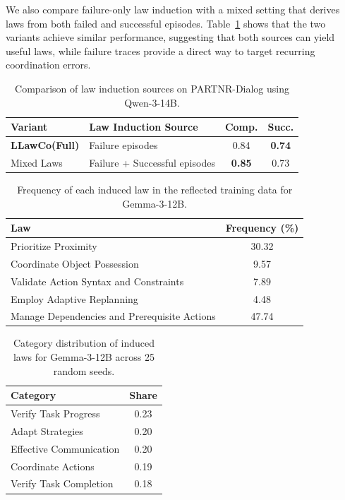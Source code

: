 \documentclass{article}
\theoremstyle{plain}
\theoremstyle{definition}
\theoremstyle{remark}
\newcommand{\name}{LLawCo\xspace}
\begin{document}
We also compare failure-only law induction with a mixed setting that derives laws from both failed and successful episodes. Table~\ref{tab:mixed-laws} shows that the two variants achieve similar performance, suggesting that both sources can yield useful laws, while failure traces provide a direct way to target recurring coordination errors.

\begin{table}[htbp]
\centering
\small
\setlength{\tabcolsep}{6pt}
\caption{Comparison of law induction sources on PARTNR-Dialog using Qwen-3-14B.}
\label{tab:mixed-laws}
\begin{tabular}{l|l|cc}
\toprule
\textbf{Variant} & \textbf{Law Induction Source} & \textbf{Comp.} & \textbf{Succ.} \\
\midrule
\textbf{\name (Full)} & Failure episodes & 0.84 & \textbf{0.74} \\
Mixed Laws & Failure + Successful episodes & \textbf{0.85} & 0.73 \\
\bottomrule
\end{tabular}
\end{table}

\begin{table}[htbp]
\centering
\small
\setlength{\tabcolsep}{6pt}
\caption{Frequency of each induced law in the reflected training data for Gemma-3-12B.}
\label{tab:law-frequency}
\begin{tabular}{l|c}
\toprule
\textbf{Law} & \textbf{Frequency (\%)} \\
\midrule
Prioritize Proximity & 30.32 \\
Coordinate Object Possession & 9.57 \\
Validate Action Syntax and Constraints & 7.89 \\
Employ Adaptive Replanning & 4.48 \\
Manage Dependencies and Prerequisite Actions & 47.74 \\
\bottomrule
\end{tabular}
\end{table}

\begin{table}[htbp]
\centering
\small
\setlength{\tabcolsep}{6pt}
\caption{Category distribution of induced laws for Gemma-3-12B across 25 random seeds.}
\label{tab:law-category-distribution}
\begin{tabular}{l|c}
\toprule
\textbf{Category} & \textbf{Share} \\
\midrule
Verify Task Progress & 0.23 \\
Adapt Strategies & 0.20 \\
Effective Communication & 0.20 \\
Coordinate Actions & 0.19 \\
Verify Task Completion & 0.18 \\
\bottomrule
\end{tabular}
\end{table}
\end{document}
